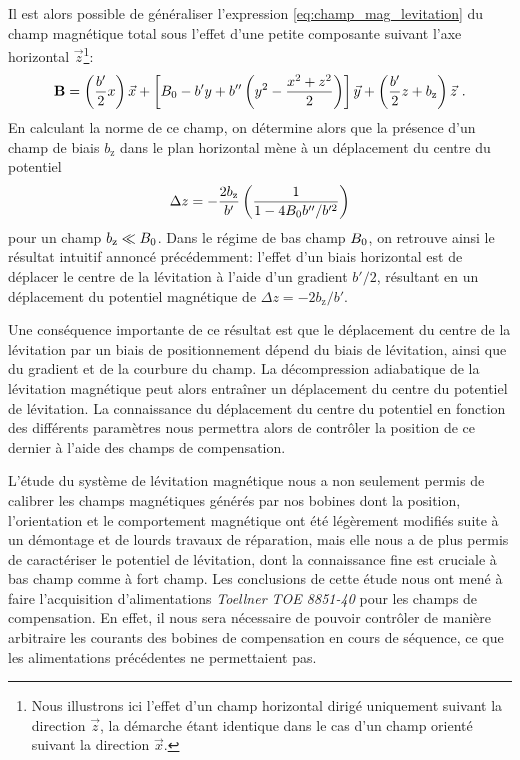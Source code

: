 Il est alors possible de généraliser l'expression \ref{eq:champ_mag_levitation} du champ magnétique total sous l'effet d'une petite composante suivant l'axe horizontal $\vec{z}$\footnote{Nous illustrons ici l'effet d'un champ horizontal dirigé uniquement suivant la direction $\vec{z}$, la démarche étant identique dans le cas d'un champ orienté suivant la direction $\vec{x}$.}:
\begin{equation}
\mathbf{B}=\left( \frac{b'}{2}x \right) \vec{x} + \left[ B_0 - b'y + b'' \left( y^2 - \frac{x^2+z^2}{2} \right) \right] \vec{y} + \left( \frac{b'}{2}z +b_{\mathrm{z}} \right) \vec{z} \text{ .}
\end{equation}
En calculant la norme de ce champ, on détermine alors que la présence d'un champ de biais $b_{\mathrm{z}}$ dans le plan horizontal mène à un déplacement du centre du potentiel
\begin{equation}
\Delta z =-\frac{2b_{\mathrm{z}}}{b'}\left( \frac{1}{1-4B_0 b'' /b'^2} \right)
\end{equation}
pour un champ $b_{\mathrm{z}} \ll B_0$. Dans le régime de bas champ $B_0$, on retrouve ainsi le résultat intuitif annoncé précédemment: l'effet d'un biais horizontal est de déplacer le centre de la lévitation à l'aide d'un gradient $b'/2$, résultant en un déplacement du potentiel magnétique de $\Delta z =-2b_{\mathrm{z}}/b'$. 

Une conséquence importante de ce résultat est que le déplacement du centre de la lévitation par un biais de positionnement dépend du biais de lévitation, ainsi que du gradient et de la courbure du champ. La décompression adiabatique de la lévitation magnétique peut alors entraîner un déplacement du centre du potentiel de lévitation. La connaissance du déplacement du centre du potentiel en fonction des différents paramètres nous permettra alors de contrôler la position de ce dernier à l'aide des champs de compensation.

L'étude du système de lévitation magnétique nous a non seulement permis de calibrer les champs magnétiques générés par nos bobines dont la position, l'orientation et le comportement magnétique ont été légèrement modifiés suite à un démontage et de lourds travaux de réparation, mais elle nous a de plus permis de caractériser le potentiel de lévitation, dont la connaissance fine est cruciale à bas champ comme à fort champ. Les conclusions de cette étude nous ont mené à faire l'acquisition d'alimentations \emph{Toellner TOE 8851-40} pour les champs de compensation. En effet, il nous sera nécessaire de pouvoir contrôler de manière arbitraire les courants des bobines de compensation en cours de séquence, ce que les alimentations précédentes ne permettaient pas.






















